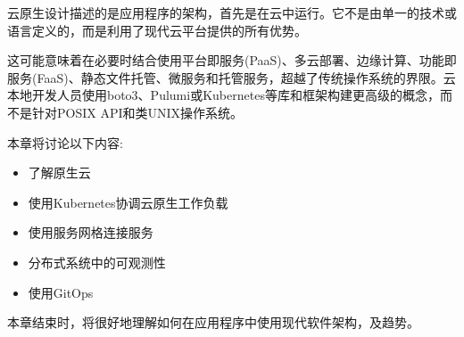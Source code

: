 
云原生设计描述的是应用程序的架构，首先是在云中运行。它不是由单一的技术或语言定义的，而是利用了现代云平台提供的所有优势。

这可能意味着在必要时结合使用平台即服务(PaaS)、多云部署、边缘计算、功能即服务(FaaS)、静态文件托管、微服务和托管服务，超越了传统操作系统的界限。云本地开发人员使用boto3、Pulumi或Kubernetes等库和框架构建更高级的概念，而不是针对POSIX API和类UNIX操作系统。

本章将讨论以下内容:

\begin{itemize}
\item 
了解原生云

\item 
使用Kubernetes协调云原生工作负载

\item 
使用服务网格连接服务

\item 
分布式系统中的可观测性

\item 
使用GitOps
\end{itemize}

本章结束时，将很好地理解如何在应用程序中使用现代软件架构，及趋势。